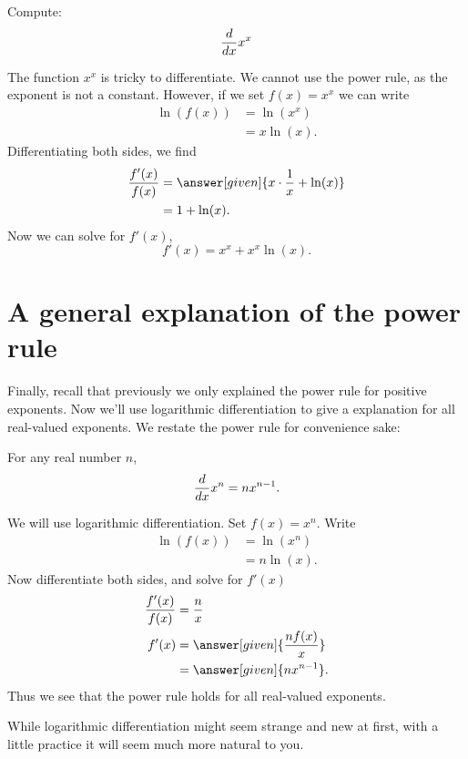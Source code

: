 \documentclass{ximera}
\begin{document}
\begin{example}
Compute:
\[
\frac{d}{dx} x^x
\]
\begin{explanation}
The function $x^x$ is tricky to differentiate. We cannot use the power
rule, as the exponent is not a constant. However, if we set $f(x) = x^x$ we can write
\begin{align*}
\ln(f(x)) &= \ln\left(x^x\right)\\
&=x\ln(x).
\end{align*}
Differentiating both sides, we find
\begin{align*}
\frac{f'(x)}{f(x)} &= \answer[given]{x\cdot \frac{1}{x} + \ln(x)}\\
&= 1 + \ln(x).
\end{align*}
Now we can solve for $f'(x)$, 
\[
f'(x) = x^x + x^x\ln(x).
\]
\end{explanation}
\end{example}






\section{A general explanation of the power rule}


Finally, recall that previously we only explained the power rule for
positive exponents. Now we'll use logarithmic differentiation to give
a explanation for all real-valued exponents. We restate the power rule
for convenience sake:

\begin{theorem}
For any real number $n$, 
\[
\frac{d}{dx} x^n = n x^{n-1}.
\]
\begin{explanation}
We will use logarithmic differentiation. Set $f(x) = x^n$. Write
\begin{align*}
\ln(f(x)) &= \ln\left(x^n\right) \\ 
&= n\ln(x).
\end{align*}
Now differentiate both sides, and solve for $f'(x)$
\begin{align*}
\frac{f'(x)}{f(x)} &= \frac{n}{x}\\
f'(x) &=\answer[given]{\frac{nf(x)}{x}}\\
&= \answer[given]{nx^{n-1}}.
\end{align*}
Thus we see that the power rule holds for all real-valued exponents.
\end{explanation}
\end{theorem}

While logarithmic differentiation might seem strange and new at
first, with a little practice it will seem much more natural to you.
\end{document}
